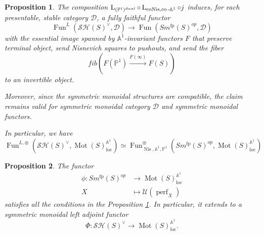 \documentclass[10pt,a4paper]{amsart}
\newtheorem{prop}{Proposition}
\newcommand{\on}{\operatorname}
\begin{document}
\begin{prop}\label{cons}
The composition $\on{L}_{(\mathbb{P}^1)^{dual}}\circ\on{L}_{\on{coNis},\on{co}{\text -}\mathbb{A}^1}\circ j$ induces, for each presentable, stable category $\mathcal{D}$, a fully faithful functor\[
\on{Fun}^L(\mathcal{SH}(S)^\vee,\mathcal{D})\rightarrow\on{Fun}(Sm^{\on{fp}}(S)^{op},\mathcal{D})
\]
with the essential image spanned by $\mathbb{A}^1$-invariant functors $F$ that preserve terminal object, send Nisnevich squares to pushouts, and send the fiber\[fib(F(\mathbb{P}^1)\xrightarrow{F(\infty)}F(S))\]
to an invertible object.


Moreover, since the symmetric monoidal structures are compatible, the claim remains valid for symmetric monoidal category $\mathcal{D}$ and symmetric monoidal functors.


In particular, we have\[\on{Fun}^{L,\otimes}(\mathcal{SH}(S)^\vee,\on{Mot}(S)_{\on{loc}}^{\mathbb{A}^1})\simeq\on{Fun}^{\otimes}_{\on{Nis},\mathbb{A}^1,\mathbb{P}^1}(Sm^{\on{fp}}(S)^{op},\on{Mot}(S)_{\on{loc}}^{\mathbb{A}^1})
\]
\end{prop}

\begin{prop}\label{ver.}
The functor\[
\begin{aligned}
\phi: Sm^{\on{fp}}(S)^{op} &\rightarrow \on{Mot}(S)_{\on{loc}}^{\mathbb{A}^1}\\
 X & \mapsto \mathcal{U}(\on{perf}_X)
 \end{aligned}\]
satisfies all the conditions in the Proposition \ref{cons}. In particular, it extends to a symmetric monoidal left adjoint functor \[ \Phi:\mathcal{SH}(S)^\vee \rightarrow \on{Mot}(S)_{\on{loc}}^{\mathbb{A}^1}.
\]
\end{prop}
\end{document}
